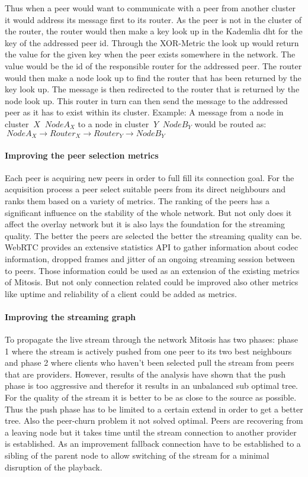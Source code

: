 Thus when a peer would want to communicate with a peer from another cluster it would address its message first to its router. As the peer is not in the cluster of the router, the router would then make a key look up in the Kademlia \gls{dht} for the key of the addressed peer id. Through the XOR-Metric the look up would return the value for the given key when the peer exists somewhere in the network. The value would be the id of the responsible router for the addressed peer. 
The router would then make a node look up to find the router that has been returned by the key look up. The message is then redirected to the router that is returned by the node look up. This router in turn can then send the message to the addressed peer as it has to exist within its cluster. 
Example: A message from a node in cluster $\ X $ $\ Node A_X $ to a node in cluster $\ Y $ $\ Node B_Y $ would be routed as:
$\ Node A_X \rightarrow Router_X \rightarrow Router_Y \rightarrow Node B_Y $
    
\paragraph{Improving the peer selection metrics}
Each peer is acquiring new peers in order to full fill its connection goal. For the acquisition process a peer select suitable peers from its direct neighbours and ranks them based on a variety of metrics. The ranking of the peers has a significant influence on the stability of the whole network. But not only does it affect the overlay network but it is also lays the foundation for the streaming quality. The better the peers are selected the better the streaming quality can be. 
WebRTC provides an extensive statistics API to gather information about codec information, dropped frames and jitter of an ongoing streaming session between to peers. Those information could be used as an extension of the existing metrics of Mitosis. 
But not only connection related could be improved also other metrics like uptime and reliability of a client could be added as metrics.

\paragraph{Improving the streaming graph}
To propagate the live stream through the network Mitosis has two phases: phase 1 where the stream is actively pushed from one peer to its two best neighbours and phase 2 where clients who haven't been selected pull the stream from peers that are providers.
However, results of the analysis have shown that the push phase is too aggressive and therefor it results in an unbalanced sub optimal tree. For the quality of the stream it is better to be as close to the source as possible.
Thus the push phase has to be limited to a certain extend in order to get a better tree.
Also the peer-churn problem it not solved optimal. Peers are recovering from a leaving node but it takes time until the stream connection to another provider is established. As an improvement fallback connection have to be established to a sibling of the parent node to allow switching of the stream for a minimal disruption of the playback.

